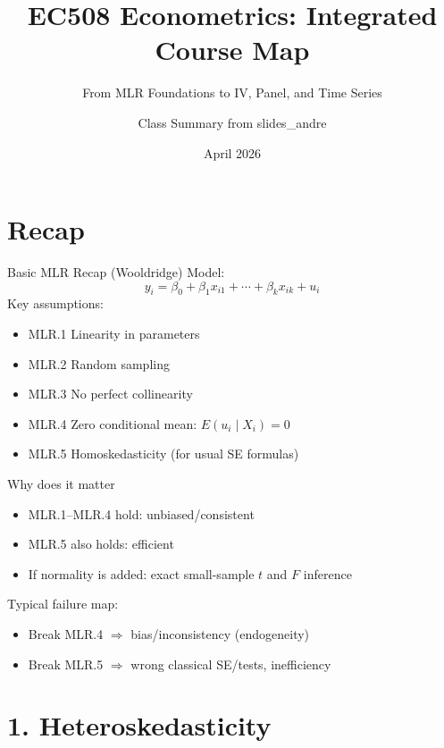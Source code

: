 \documentclass[aspectratio=169]{beamer}
\title[EC508 Map]{EC508 Econometrics: Integrated Course Map}
\subtitle{From MLR Foundations to IV, Panel, and Time Series}
\author{Class Summary from slides\_andre}
\date{April 2026}
\begin{document}
\begin{frame}
	\titlepage
\end{frame}

\begin{frame}
	\tableofcontents
\end{frame}


\section{Recap}

\begin{frame}{Basic MLR Recap (Wooldridge)}
Model:
\[
y_i = \beta_0 + \beta_1 x_{i1} + \cdots + \beta_k x_{ik} + u_i
\]
Key assumptions:
\begin{itemize}
	\item MLR.1 Linearity in parameters
	\item MLR.2 Random sampling
	\item MLR.3 No perfect collinearity
	\item MLR.4 Zero conditional mean: $E(u_i\mid X_i)=0$
	\item MLR.5 Homoskedasticity (for usual SE formulas)
\end{itemize}
\end{frame}

\begin{frame}{Why does it matter}
\begin{itemize}
	\item MLR.1--MLR.4 hold: unbiased/consistent
	\item MLR.5 also holds: efficient
	\item If normality is added: exact small-sample $t$ and $F$ inference
\end{itemize}
\vspace{0.3cm}
Typical failure map:
\begin{itemize}
	\item Break MLR.4 $\Rightarrow$ bias/inconsistency (endogeneity)
	\item Break MLR.5 $\Rightarrow$ wrong classical SE/tests, inefficiency
\end{itemize}
\end{frame}

\section{1. Heteroskedasticity}
\end{document}
